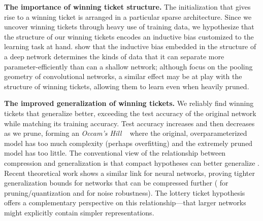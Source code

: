 
\textbf{The importance of winning ticket structure.}
The initialization that gives rise to a winning ticket is arranged in a particular sparse architecture.
Since we uncover winning tickets through heavy use of training data, we hypothesize that the structure of
our winning tickets encodes an inductive bias customized to the learning task at hand.  \citet{inductive-bias} show that
the inductive bias embedded in the structure of a deep network determines the kinds of data that it can
separate more parameter-efficiently than can a shallow network; although \citet{inductive-bias} focus on the
pooling geometry of convolutional networks, a similar effect may be at play with the structure of winning tickets, allowing them
to learn even when heavily pruned.

\textbf{The improved generalization of winning tickets.}
We reliably find winning tickets that generalize better, exceeding the test accuracy of the original
network while matching its training accuracy.
Test accuracy increases and then decreases as we prune, forming an {\em Occam's Hill}
~\citep{occam} where the original, overparameterized model has too much
complexity (perhaps overfitting) and the
extremely pruned model has too little.
%
The conventional view of the relationship between compression and generalization is that compact hypotheses
can better generalize \citep{mdl}. Recent theoretical work shows a similar link for neural networks,
proving tighter generalization bounds for networks that can be compressed further
(\citet{comp} for pruning/quantization and \citet{arora} for noise robustness). The lottery ticket hypothesis offers a
complementary perspective on this relationship---that larger networks might explicitly contain simpler representations.

